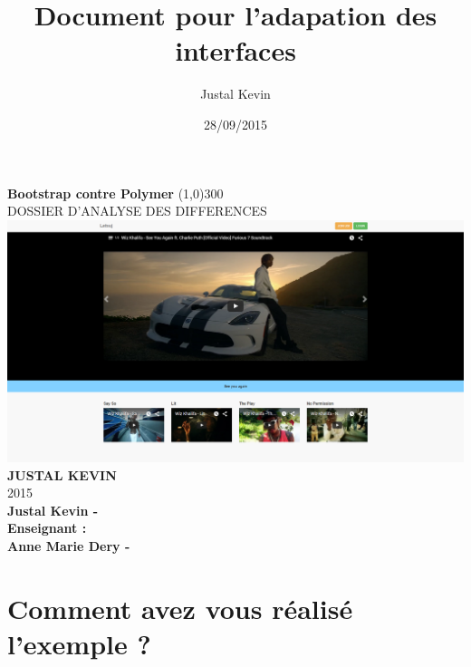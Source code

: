 \documentclass{article}
\title{Document pour l'adapation des interfaces}
\author{Justal Kevin}
\date{28/09/2015}
\begin{document}
\begin{center}
\textbf{\Huge{Bootstrap contre Polymer}}
\line(1,0){300}\\
DOSSIER D'ANALYSE DES DIFFERENCES\\
\vspace{3cm}
\includegraphics[width=1.0\textwidth]{pc}\\
\vspace{3cm}
\textbf{\Large{JUSTAL KEVIN}}\\
2015\\
\vspace{2cm}
\textbf{Justal Kevin -  \color{black}{- SI5 - IHM}}\\
\vspace{4cm}
\textbf{Enseignant :}\\
\textbf{Anne Marie Dery - }
\end{center}

\newpage
\newpage
\tableofcontents

\newpage

\section{Comment avez vous r\'ealis\'e l'exemple ?}
\end{document}
